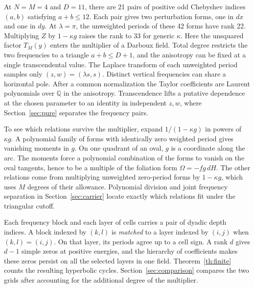 \documentclass[11pt,a4paper]{amsart}
\numberwithin{equation}{section}
\newcommand{\QQ}{\mathbb Q}
\begin{document}
At \(N=M=4\) and \(D=11\), there are 21 pairs of positive odd Chebyshev indices \((a,b)\) satisfying \(a+b\le12\). Each pair gives two perturbation forms, one in \(dx\) and one in \(dy\). At \(\lambda=\pi\), the unweighted periods of these 42 forms have rank 22. Multiplying \(Z\) by \(1-\kappa g\) raises the rank to 33 for generic \(\kappa\).
Here the unsquared factor \(T_M(y)\) enters the multiplier of a Darboux field. Total degree restricts the two frequencies to a triangle \(a+b\le D+1\), and the anisotropy can be fixed at a single transcendental value. The Laplace transform of each unweighted period samples only \((z,w)=(\lambda s,s)\). Distinct vertical frequencies can share a horizontal pole. After a common normalization the Taylor coefficients are Laurent polynomials over \(\QQ\) in the anisotropy. Transcendence lifts a putative dependence at the chosen parameter to an identity in independent \(z,w\), where Section~\ref{sec:pure} separates the frequency pairs.

To see which relations survive the multiplier, expand \(1/(1-\kappa g)\) in powers of \(\kappa g\). A polynomial family of forms with identically zero weighted period gives vanishing moments in \(g\). On one quadrant of an oval, \(g\) is a coordinate along the arc. The moments force a polynomial combination of the forms to vanish on the oval tangents, hence to be a multiple of the foliation form \(\Omega=-fg\,dH\). The other relations come from multiplying unweighted zero-period forms by \(1-\kappa g\), which uses \(M\) degrees of their allowance. Polynomial division and joint frequency separation in Section~\ref{sec:carrier} locate exactly which relations fit under the triangular cutoff.

Each frequency block and each layer of cells carries a pair of dyadic depth indices. A block indexed by \((k,l)\) is \emph{matched} to a layer indexed by \((i,j)\) when \((k,l)=(i,j)\). On that layer, its periods agree up to a cell sign. A rank \(d\) gives \(d-1\) simple zeros at positive energies, and the hierarchy of coefficients makes these zeros persist on all the selected layers in one field. Theorem~\ref{th:finite} counts the resulting hyperbolic cycles. Section~\ref{sec:comparison} compares the two grids after accounting for the additional degree of the multiplier.
\end{document}
